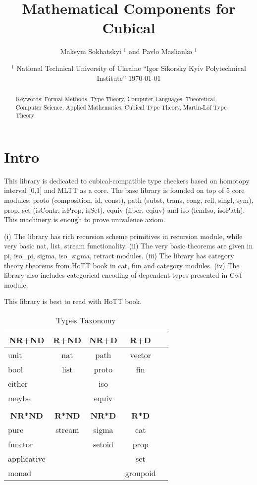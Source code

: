 \documentclass{article}
\newcommand*{\thead}[1]{\multicolumn{1}{c}{\bfseries #1}}
\begin{document}
\title{Mathematical Components for Cubical}
\author{Maksym Sokhatskyi $^1$ and Pavlo Maslianko $^1$}
\date{
    $^1$ National Technical University of Ukraine ``Igor Sikorsky Kyiv Polytechnical Institute''
    \today
}

\maketitle

\begin{abstract}
Keywords: Formal Methods, Type Theory, Computer Languages,
          Theoretical Computer Science, Applied Mathematics,
          Cubical Type Theory, Martin-Löf Type Theory
\end{abstract}

\section{Intro}

This library is dedicated to cubical-compatible type checkers based
on homotopy interval [0,1] and MLTT as a core. The base library is
founded on top of 5 core modules: proto (composition, id, const),
path (subst, trans, cong, refl, singl, sym), prop, set (isContr, isProp, isSet),
equiv (fiber, eqiuv) and iso (lemIso, isoPath).
This machinery is enough to prove univalence axiom.

(i) The library has rich recursion scheme primitives
in recursion module, while very basic nat, list, stream
functionality. (ii) The very basic theorems are given
in pi, iso\_pi, sigma, iso\_sigma, retract modules.
(iii) The library has category theory theorems from
HoTT book in cat, fun and category modules.
(iv) The library also includes categorical encoding
of dependent types presented in Cwf module.

This library is best to read with HoTT book.

\begin{table}[h]
\centering
\caption{Types Taxonomy}
\label{tab:a}
\begin{tabular}{lcccc}
\hline
\thead{NR+ND} & \thead{R+ND} & \thead{NR+D} & \thead{R+D}\\
\hline
unit        & nat    & path    & vector \\
bool        & list   & proto   & fin \\
either      &        & iso     &  \\
maybe       &        & equiv   &  \\
            &        &         &  \\
\hline
\thead{NR*ND} & \thead{R*ND} & \thead{NR*D} & \thead{R*D}\\
\hline
pure        & stream & sigma   & cat  \\
functor     &        & setoid  & prop \\
applicative &        &         & set  \\
monad       &        &         & groupoid \\
\end{tabular}
\end{table}
\end{document}
